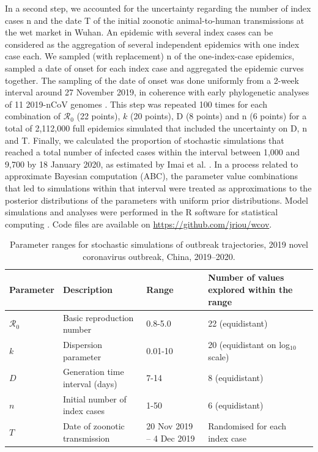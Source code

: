 \documentclass{article}
\begin{document}
In a second step, we accounted for the uncertainty regarding the number of index cases n and the date T of the initial zoonotic animal-to-human transmissions at the wet market in Wuhan. An epidemic with several index cases can be considered as the aggregation of several independent epidemics with one index case each. We sampled (with replacement) n of the one-index-case epidemics, sampled a date of onset for each index case and aggregated the epidemic curves together. The sampling of the date of onset was done uniformly from a 2-week interval around 27 November 2019, in coherence with early phylogenetic analyses of 11 2019-nCoV genomes \cite{Rambaut:2020}. This step was repeated 100 times for each combination of $\mathcal{R}_0$ (22 points), $k$ (20 points), D (8 points) and n (6 points) for a total of 2,112,000 full epidemics simulated that included the uncertainty on D, n and T. Finally, we calculated the proportion of stochastic simulations that reached a total number of infected cases within the interval between 1,000 and 9,700 by 18 January 2020, as estimated by Imai et al. \cite{Imai:2020}. In a process related to approximate Bayesian computation (ABC), the parameter value combinations that led to simulations within that interval were treated as approximations to the posterior distributions of the parameters with uniform prior distributions. Model simulations and analyses were performed in the R software for statistical computing \cite{R:2018}. Code files are available on \url{https://github.com/jriou/wcov}.

\begin{table}
	\centering
	\caption{Parameter ranges for stochastic simulations of outbreak trajectories, 2019 novel coronavirus outbreak, China, 2019–2020.}
	\label{fig:tab1}
\begin{tabular}{lllp{4.5cm}}
	\hline
	Parameter & Description & Range & Number of values explored within the range   \\
	\hline 
	$\mathcal{R}_0$& Basic reproduction number  	& 0.8-5.0 & 22 (equidistant) \\ 
	$k$ & Dispersion parameter 			& 0.01-10 & 20 (equidistant on log$_{10}$ scale)\\
	$D$ & Generation time interval (days)& 7-14   & 8 (equidistant) \\
	$n$ & Initial number of index cases & 1-50    & 6 (equidistant) \\
	$T$ & Date of zoonotic transmission & 20 Nov 2019 -- 4 Dec 2019 & Randomised for each index case \\
	
	\hline 
\end{tabular} 
\end{table}
\end{document}
